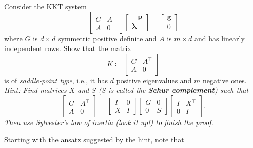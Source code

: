 \documentclass{../kin_math}
\begin{document}
\begin{questions}
  \question Consider the KKT system
  \begin{equation*}
    \begin{bmatrix} G & A^\top \\ A & 0 \end{bmatrix} \begin{bmatrix} -\textbf{p} \\ \boldsymbol{\lambda} \end{bmatrix} = \begin{bmatrix} \textbf{g} \\ 0 \end{bmatrix}
  \end{equation*}
  where $G$ is $d \times d$ symmetric positive definite and $A$ is $m \times d$ and has linearly independent rows. Show that the matrix
  \begin{equation*}
    K \coloneqq \begin{bmatrix} G & A^\top \\ A & 0 \end{bmatrix}
  \end{equation*}
  is of \emph{saddle-point type}, i.e., it has $d$ positive eigenvalues and $m$ negative ones. \emph{Hint: Find matrices $X$ and $S$ ($S$ is called the \textbf{Schur complement}) such that
  \begin{equation*}
    \begin{bmatrix} G & A^\top \\ A & 0 \end{bmatrix} = \begin{bmatrix} I & 0 \\ X & I \end{bmatrix} \begin{bmatrix} G & 0 \\ 0 & S \end{bmatrix} \begin{bmatrix} I & X^\top \\ 0 & I \end{bmatrix}.
  \end{equation*}
  Then use Sylvester's law of inertia (look it up!) to finish the proof.}
  \begin{solution}
    Starting with the ansatz suggested by the hint, note that
    \begin{equation*}

\end{equation*}
\end{solution}
\end{questions}
\end{document}
